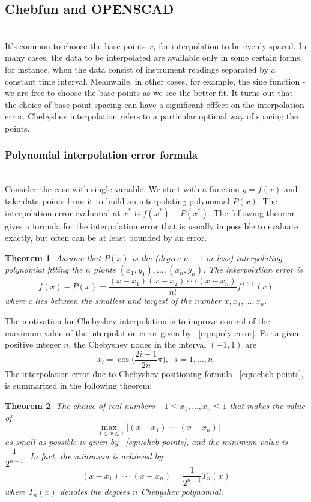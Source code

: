 \documentclass[11pt]{amsart}
\newtheorem{theorem}{Theorem}%
\theoremstyle{definition}
\begin{document}
\subsection{Chebfun and OPENSCAD}~\\
It's common to choose the base points $x_i$ for interpolation to be evenly spaced. In many cases, the data to be interpolated are available only in some certain forms, for instance, when the data consist of instrument readings separated by a constant time interval. Meanwhile, in other cases, for example, the sine function - we are free to choose the base points as we see the better fit. It turns out that the choice of base point spacing can have a significant efffect on the interpolation error. Chebyshev interpolation refers to a particular optimal way of spacing the points.\\ 
\subsubsection{Polynomial interpolation error formula}~\\
Consider the case with single variable. We start with a function $y=f(x)$ and take data points from it to build an interpolating polynomial $P(x)$. The interpolation error evaluated at $x^*$ is $f(x^*)-P(x^*)$. The following theorem gives a formula for the interpolation error that is usually impossible to evaluate exactly, but often can be at least bounded by an error.
\begin{theorem}
Assume that $P(x)$ is the (degree $n-1$ or less) interpolating polynomial fitting the $n$ pionts $(x_1,y_1),...,(x_n,y_n)$. The interpolation error is 
\begin{equation}
\label{eqn:poly error}
f(x)-P(x)=\frac{(x-x_1)(x-x_2)\cdot\cdot\cdot(x-x_n)}{n!}f^{(n)}(c)
\end{equation}
where $c$ lies between the smallest and largest of the number $x,x_1,...,x_n.$
\end{theorem}
The motivation for Chebyshev interpolation is to improve control of the maximum value of the interpolation error given by ~\eqref{eqn:poly error}. For a given positive integer $n$, the Chebyshev nodes in the interval $(-1,1)$ are
\begin{equation}
\label{eqn:cheb points}
x_i=\cos\Big(\frac{2i-1}{2n}\pi\Big),\mbox{ }i=1,...,n.
\end{equation}
The interpolation error due to Chebyshev positioning formula ~\eqref{eqn:cheb points}, is summarized in the following theorem:
\begin{theorem}
The choice of real numbers $-1\le x_1,...,x_n\le 1$ that makes the value of 
\begin{equation}
\max_{-1 \leq x \leq 1}|(x-x_1)\cdot\cdot\cdot(x-x_n)|
\end{equation}
as small as possible is given by ~\eqref{eqn:cheb points}, and the minimum value is $\dfrac{1}{2^{n-1}}$. In fact, the minimum is achieved by 
\begin{equation}
\label{eqn:cheb error}
(x-x_1)\cdot\cdot\cdot(x-x_n)=\frac{1}{2^{n-1}}T_n(x)
\end{equation}
where $T_n(x)$ denotes the degrees $n$ Chebyshev polynomial.
\end{theorem}
\end{document}

